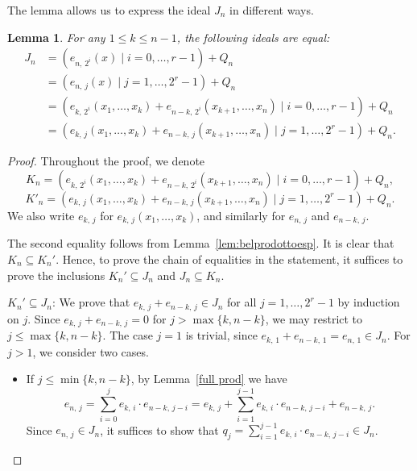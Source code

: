 \documentclass[11pt]{article}
\newcommand{\es}[2]{e_{#1,\, #2}}
\theoremstyle{plain}
\newtheorem{lem}[theo]{Lemma}
\theoremstyle{definition}
\theoremstyle{remark}
\begin{document}
The lemma allows us to express the ideal $J_n$ in different ways.
\begin{lem}\label{JnKnK'n}
For any $1\leq k\leq n-1$, the following ideals are equal:
    \begin{align*}
        J_n&=(\es{n}{2^i}(x)\mid i=0,\dots,r-1)+Q_n \\ 
        &=(\es{n}{j}(x)\mid j=1,\dots,2^r-1)+Q_n\\
        &=(\es{k}{2^i}(x_1,\dots,x_k)+\es{n-k}{2^i}(x_{k+1},\dots,x_n)\mid i=0,\dots,r-1)+Q_n\\
        &=(\es{k}{j}(x_1,\dots,x_k)+\es{n-k}{j}(x_{k+1},\dots,x_n)\mid j=1,\dots,2^r-1)+Q_n.
    \end{align*}
\end{lem}
\begin{proof}
    Throughout the proof, we denote $$K_n=(\es{k}{2^i}(x_1,\dots,x_k)+\es{n-k}{2^i}(x_{k+1},\dots,x_n)\mid i=0,\dots,r-1)+Q_n,$$ $$K'_n=(\es{k}{j}(x_1,\dots,x_k)+\es{n-k}{j}(x_{k+1},\dots,x_n)\mid j=1,\dots,2^r-1)+Q_n.$$ We also write $\es{k}{j}$ for $\es{k}{j}(x_1,\dots,x_k)$, and similarly for $\es{n}{j}$ and $\es{n-k}{j}$.

    The second equality follows from Lemma~\ref{lem:belprodottoesp}.
    It is clear that $K_n\subseteq K_n'$. Hence, to prove the chain of equalities in the statement, it suffices to prove the inclusions $K_n'\subseteq J_n$ and $J_n\subseteq K_n$.
    
    $K_n'\subseteq J_n$: We prove that $\es{k}{j}+\es{n-k}{j}\in J_n$ for all $j=1,\dots,2^r-1$ by induction on $j$. Since $\es{k}{j}+\es{n-k}{j}=0$ for $j>\max\{k,n-k\}$, we may restrict to $j\leq\max\{k,n-k\}$.
    The case $j=1$ is trivial, since $\es{k}{1}+\es{n-k}{1}=\es{n}{1}\in J_n$. For $j>1$, we consider two cases.
    \begin{itemize}
        \item If $j\leq\min\{k,n-k\}$, by Lemma~\ref{full prod} we have
        \begin{equation*}
            \es{n}{j}=\sum\limits_{i=0}^j\es{k}{i}\cdot\es{n-k}{j-i}=\es{k}{j}+\sum\limits_{i=1}^{j-1}\es{k}{i}\cdot\es{n-k}{j-i}+\es{n-k}{j}.
        \end{equation*}
        Since $\es{n}{j}\in J_n$, it suffices to show that $q_j=\sum\limits_{i=1}^{j-1}\es{k}{i}\cdot\es{n-k}{j-i}\in J_n$.


\end{itemize}
\end{proof}
\end{document}
